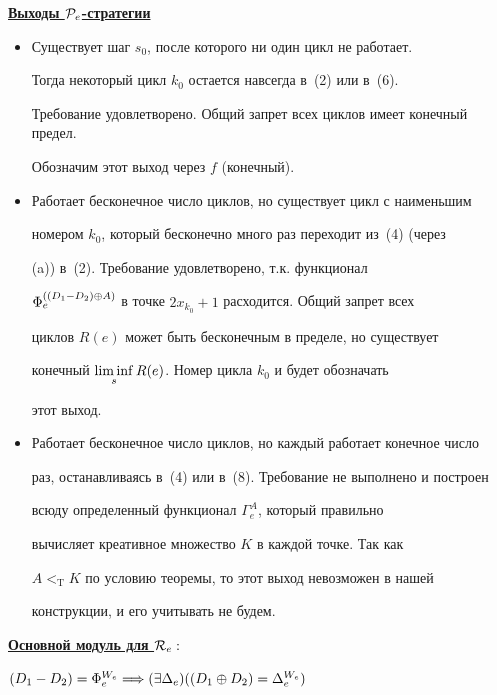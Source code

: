 \underline{\bf Выходы ${\cal P}_e$-стратегии}


\begin{itemize}


\item[1)] Существует шаг $s_0$, после которого ни один цикл не работает.


Тогда некоторый цикл $k_0$ остается навсегда в~(2) или в~(6).


Требование удовлетворено. Общий запрет всех циклов имеет конечный предел.


Обозначим этот выход через $f$ (конечный).


\item[2)] Работает бесконечное число циклов, но существует цикл с наименьшим


номером $k_0$, который бесконечно много раз переходит из~(4) (через


(a)) в~(2). Требование удовлетворено, т.к. функционал 


$\Phi_e^{((D_1-D_2)\oplus A)}$ в точке $2x_{k_0}+1$ расходится. Общий запрет всех


циклов $R(e)$ может быть бесконечным в пределе, но существует


конечный $\limi\limits_s R(e)$. Номер цикла $k_0$ и будет обозначать


этот выход.


\item[3)] Работает бесконечное число циклов, но каждый работает конечное число


раз, останавливаясь в~(4) или в~(8). Требование не выполнено и построен


всюду определенный функционал $\Gamma_e^A$, который правильно


вычисляет креативное множество $K$ в каждой точке. Так как


$A<_{\mathrm T}K$ по условию теоремы, то этот выход невозможен в нашей


конструкции, и его учитывать не будем.


\end{itemize}





\underline{\bf Основной модуль для ${\cal R}_e:$}


$\draz=\Phi_e^{W_e}\Longrightarrow(\exists\Delta_e)


(\dsum=\Delta_e^{W_e})$


\medskip





